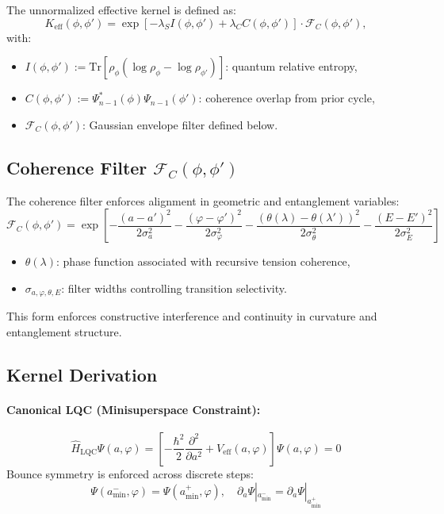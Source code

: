 The unnormalized effective kernel is defined as:
\begin{equation}
K_{\text{eff}}(\phi, \phi') = \exp\left[-\lambda_S I(\phi, \phi') + \lambda_C C(\phi, \phi') \right] \cdot \mathcal{F}_C(\phi, \phi'),
\end{equation}
with:
\begin{itemize}
    \item \( I(\phi, \phi') := \mathrm{Tr}[\rho_\phi (\log \rho_\phi - \log \rho_{\phi'})] \): quantum relative entropy,
    \item \( C(\phi, \phi') := \Psi_{n-1}^*(\phi) \Psi_{n-1}(\phi') \): coherence overlap from prior cycle,
    \item \( \mathcal{F}_C(\phi, \phi') \): Gaussian envelope filter defined below.
\end{itemize}

\subsection{Coherence Filter \( \mathcal{F}_C(\phi,\phi') \)}
\label{subsec:coherence-filter}

The coherence filter enforces alignment in geometric and entanglement variables:
\[
\mathcal{F}_C(\phi, \phi') = \exp\left[
    -\frac{(a - a')^2}{2\sigma_a^2}
    -\frac{(\varphi - \varphi')^2}{2\sigma_\varphi^2}
    -\frac{(\theta(\lambda) - \theta(\lambda'))^2}{2\sigma_\theta^2}
    -\frac{(E - E')^2}{2\sigma_E^2}
\right]
\]
\begin{itemize}
    \item \( \theta(\lambda) \): phase function associated with recursive tension coherence,
    \item \( \sigma_{a,\varphi,\theta,E} \): filter widths controlling transition selectivity.
\end{itemize}
This form enforces constructive interference and continuity in curvature and entanglement structure.

\subsection{Kernel Derivation}
\label{subsec:kernel-derivation}

\paragraph{Canonical LQC (Minisuperspace Constraint):}
\[
\hat{H}_{\text{LQC}}\Psi(a,\varphi) = \left[
    -\frac{\hbar^2}{2}\frac{\partial^2}{\partial a^2} + V_{\text{eff}}(a,\varphi)
\right]\Psi(a,\varphi) = 0
\]
Bounce symmetry is enforced across discrete steps:
\[
\Psi(a_{\text{min}}^-, \varphi) = \Psi(a_{\text{min}}^+, \varphi), \quad
\partial_a\Psi|_{a_{\text{min}}^-} = \partial_a\Psi|_{a_{\text{min}}^+}
\]

